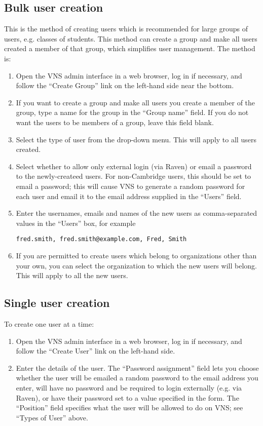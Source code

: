 \documentclass[a4paper,12pt]{report}
\begin{document}
\subsection{Bulk user creation}
This is the method of creating users which is recommended for large groups of users, e.g. classes of students.  This method can create a group and make all users created a member of that group, which simplifies user management.  The method is:
\begin{enumerate}
\item Open the VNS admin interface in a web browser, log in if necessary, and follow the ``Create Group'' link on the left-hand side near the bottom.
\item If you want to create a group and make all users you create a member of the group, type a name for the group in the ``Group name'' field.  If you do not want the users to be members of a group, leave this field blank.
\item Select the type of user from the drop-down menu.  This will apply to all users created.
\item Select whether to allow only external login (via Raven) or email a password to the newly-createed users.  For non-Cambridge users, this should be set to email a password; this will cause VNS to generate a random password for each user and email it to the email address supplied in the ``Users'' field.
\item Enter the usernames, emails and names of the new users as comma-separated values in the ``Users'' box, for example

\texttt{fred.smith, fred.smith@example.com, Fred, Smith}

\item If you are permitted to create users which belong to organizations other than your own, you can select the organization to which the new users will belong.  This will apply to all the new users.
\end{enumerate}

\subsection{Single user creation}
To create one user at a time:
\begin{enumerate}
\item Open the VNS admin interface in a web browser, log in if necessary, and follow the ``Create User'' link on the left-hand side.
\item Enter the details of the user.  The ``Password assignment'' field lets you choose whether the user will be emailed a random password to the email address you enter, will have no password and be required to login externally (e.g. via Raven), or have their password set to a value specified in the form.  The ``Position'' field specifies what the user will be allowed to do on VNS; see ``Types of User'' above.
\end{enumerate}
\end{document}
